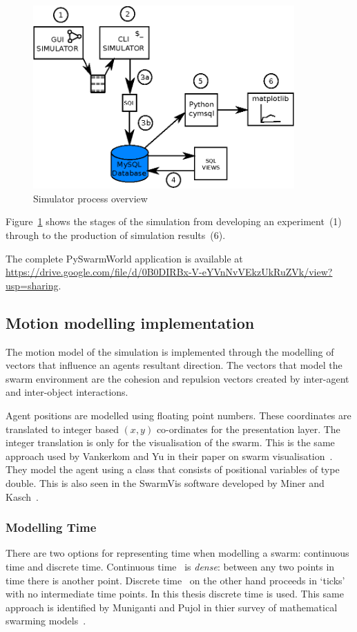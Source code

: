 \begin{figure}[H]
\begin{center}
\includegraphics[width=10cm]{CHAPTER-3/figures/SimulatorProcess}
\end{center}
\caption{Simulator process overview\label{sim:SimulatorOverview}}
\end{figure}

Figure~\ref{sim:SimulatorOverview} shows the stages of the simulation from developing an experiment~(1) through to the production of simulation results~(6).

The complete PySwarmWorld application is available at \url{https://drive.google.com/file/d/0B0DIRBx-V-eYVnNvVEkzUkRuZVk/view?usp=sharing}.

\subsection{Motion modelling implementation}
The motion model of the simulation is implemented through the modelling of vectors that influence an agents resultant direction. The vectors that model the swarm environment are the cohesion and repulsion vectors created by inter-agent and inter-object interactions. 

Agent positions are modelled using floating point numbers. These coordinates are translated to integer based $(x,y)$ co-ordinates for the presentation layer. The integer translation is only for the visualisation of the swarm. This is the same approach used by Vankerkom and Yu in their paper on swarm visualisation~\cite{VY:04}. They model the agent using a class that consists of positional variables of type double. This is also seen in the SwarmVis software developed by Miner and Kasch~\cite{DMNK:ND}.

\subsubsection{Modelling Time}\label{sim:time}
There are two options for representing time when modelling a swarm: continuous time and discrete time. Continuous time~\cite{HW:08} is \textit{dense}: between any two points in time there is another point. Discrete time~\cite{FAP:05, GP:05, RVMH:13, HER:11, MP:10, PCL:08a} on the other hand proceeds in `ticks' with no intermediate time points. In this thesis discrete time is used. This same approach is identified by Muniganti and Pujol in thier survey of mathematical swarming models~\cite{MP:10}. 

